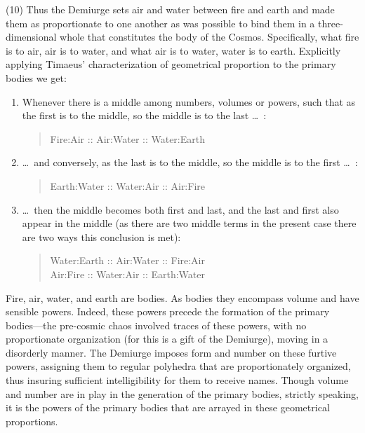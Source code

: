 (10) Thus the Demiurge sets air and water between fire and earth and made them as proportionate to one another as was possible to bind them in a three-dimensional whole that constitutes the body of the Cosmos. Specifically, what fire is to air, air is to water, and what air is to water, water is to earth. Explicitly applying Timaeus' characterization of geometrical proportion to the primary bodies we get:
\begin{enumerate}[(1)]
	\item Whenever there is a middle among numbers, volumes or powers, such that as the first is to the middle, so the middle is to the last \ldots\ :
	\begin{quote}
		Fire:Air :: Air:Water :: Water:Earth
	\end{quote}
	\item \ldots\ and conversely, as the last is to the middle, so the middle is to the first \dots\ :
	\begin{quote}
		Earth:Water :: Water:Air :: Air:Fire
	\end{quote}
	\item \ldots\ then the middle becomes both first and last, and the last and first also appear in the middle (as there are two middle terms in the present case there are two ways this conclusion is met):
	\begin{quote}
		Water:Earth :: Air:Water :: Fire:Air\\
		Air:Fire :: Water:Air :: Earth:Water
	\end{quote}
\end{enumerate}
Fire, air, water, and earth are bodies. As bodies they encompass volume and have sensible powers. Indeed, these powers precede the formation of the primary bodies---the pre-cosmic chaos involved traces of these powers, with no proportionate organization (for this is a gift of the Demiurge), moving in a disorderly manner. The Demiurge imposes form and number on these furtive powers, assigning them to regular polyhedra that are proportionately organized, thus insuring sufficient intelligibility for them to receive names. Though volume and number are in play in the generation of the primary bodies, strictly speaking, it is the powers of the primary bodies that are arrayed in these geometrical proportions. 

